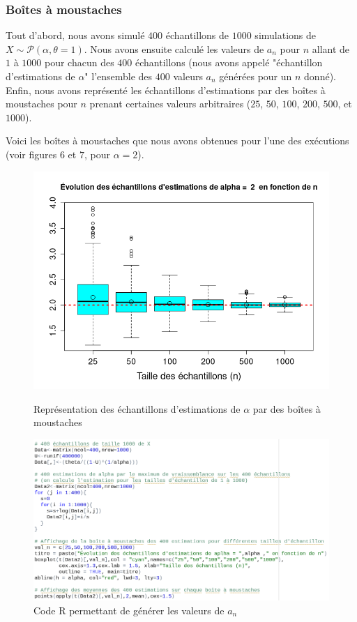 \documentclass{article}
\begin{document}
\subsubsection{Boîtes à moustaches}

Tout d'abord, nous avons simulé $400$ échantillons de $1000$ simulations de $X \sim \mathcal{P}(\alpha,\theta=1)$. Nous avons ensuite calculé les valeurs de $a_n$ pour $n$ allant de $1$ à $1000$ pour chacun des $400$ échantillons (nous avons appelé "échantillon d'estimations de $\alpha$" l'ensemble des $400$ valeurs $a_n$ générées pour un $n$ donné). Enfin, nous avons représenté les échantillons d'estimations par des boîtes à moustaches pour $n$ prenant certaines valeurs arbitraires ($25$, $50$, $100$, $200$, $500$, et $1000$).

Voici les boîtes à moustaches que nous avons obtenues pour l'une des exécutions (voir figures $6$ et $7$, pour $\alpha=2$).

\clearpage

\begin{figure}[!h]
\begin{center}
\includegraphics[width=12cm]{plot_box}
\caption{Représentation des échantillons d'estimations de $\alpha$ par des boîtes à moustaches}
\vspace{\floatsep}
\vspace{\floatsep}
\includegraphics[width=12cm]{code_box}
\caption{Code R permettant de générer les valeurs de $a_n$}
\end{center}
\end{figure}
\end{document}
